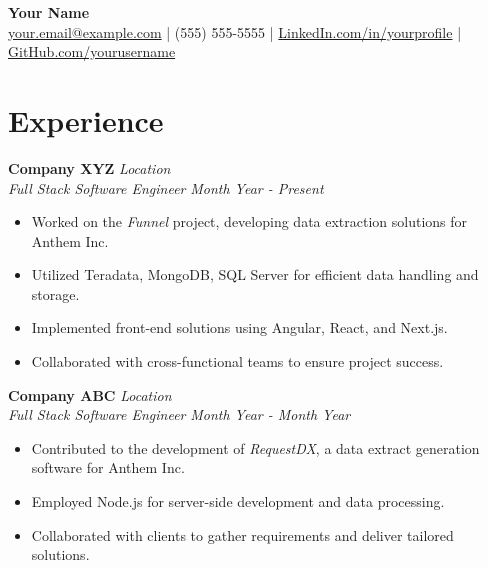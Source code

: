 \documentclass[a4paper,10pt]{article}
\begin{document}
\begin{center}
    \textbf{\LARGE Your Name} \\
    \vspace{5pt}
    \href{mailto:your.email@example.com}{your.email@example.com} \hspace{5pt}|\hspace{5pt} (555) 555-5555 \hspace{5pt}|\hspace{5pt} \href{https://linkedin.com/in/yourprofile}{LinkedIn.com/in/yourprofile} \hspace{5pt}|\hspace{5pt} \href{https://github.com/yourusername}{GitHub.com/yourusername}
\end{center}

\section*{Experience}

\textbf{Company XYZ} \hfill \textit{Location} \\
\textit{Full Stack Software Engineer} \hfill \textit{Month Year - Present}
\begin{itemize}[label=--]
    \item Worked on the \textit{Funnel} project, developing data extraction solutions for Anthem Inc.
    \item Utilized Teradata, MongoDB, SQL Server for efficient data handling and storage.
    \item Implemented front-end solutions using Angular, React, and Next.js.
    \item Collaborated with cross-functional teams to ensure project success.
\end{itemize}

\textbf{Company ABC} \hfill \textit{Location} \\
\textit{Full Stack Software Engineer} \hfill \textit{Month Year - Month Year}
\begin{itemize}[label=--]
    \item Contributed to the development of \textit{RequestDX}, a data extract generation software for Anthem Inc.
    \item Employed Node.js for server-side development and data processing.
    \item Collaborated with clients to gather requirements and deliver tailored solutions.
\end{itemize}
\end{document}
